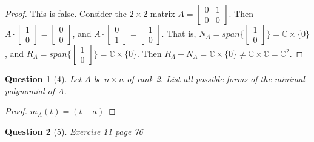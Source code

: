 \documentclass[11pt]{article}
\theoremstyle{quest}
\newtheorem*{question}{Question}
\begin{document}
\begin{proof}
This is false. Consider the $2 \times 2$ matrix $A = \begin{bmatrix} 0 & 1 \\ 0 & 0 \end{bmatrix}$. Then $A \cdot \begin{bmatrix} 1\\ 0 \end{bmatrix} = \begin{bmatrix} 0\\ 0 \end{bmatrix}$, and $A \cdot \begin{bmatrix} 0\\ 1 \end{bmatrix} = \begin{bmatrix} 1\\ 0 \end{bmatrix}$. That is, $N_A = span\Big\{\begin{bmatrix} 1\\ 0 \end{bmatrix}\Big\} = \mathbb{C} \times \{0\}$, and $R_A = span\Big\{\begin{bmatrix} 1\\ 0 \end{bmatrix}\Big\} = \mathbb{C} \times \{0\}$. Then $R_A + N_A = \mathbb{C} \times \{0\} \ne \mathbb{C} \times \mathbb{C} = \mathbb{C}^2$.
\end{proof}
\begin{question}[4]
Let $A$ be $n \times n$ of rank 2. List all possible forms of the minimal polynomial of $A$.
\end{question}
\begin{proof}
$m_A(t) = (t-a)$
\end{proof}
\begin{question}[5]
Exercise 11 page 76
\end{question}
\end{document}
